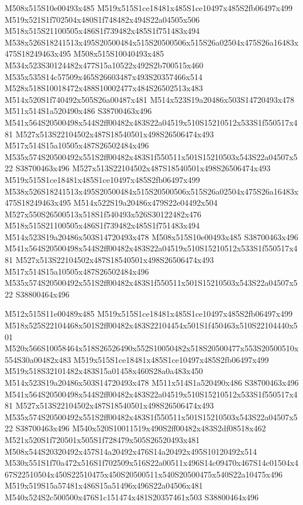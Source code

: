 \documentclass{article}
\begin{document}
\begin{multicols}{2}
M508x515S10e00493x485 M519x515S1ce18481x485S1ce10497x485S2fb06497x499 M519x521S1f702504x480S1f748482x494S22a04505x506 M518x515S21100505x486S1f739482x485S1f751483x494 M538x526S18241513x495S20500484x515S20500506x515S26a02504x475S26a16483x475S18249463x495 M508x515S10040493x485 M534x523S30124482x477S15a10522x492S2b700515x460 M535x535S14c57509x465S26603487x493S20357466x514 M528x518S10018472x488S10002477x484S26502513x483 M514x520S1f740492x505S26a00487x481 M514x523S19a20486x503S14720493x478 M511x514S1a520490x486 S38700463x496 M541x564S20500498x544S2ff00482x483S22a04519x510S15210512x533S1f550517x481 M527x513S22104502x487S18540501x498S26506474x493 M517x514S15a10505x487S26502484x496 M535x574S20500492x551S2ff00482x483S1f550511x501S15210503x543S22a04507x522 S38700463x496 M527x513S22104502x487S18540501x498S26506474x493 M519x515S1ce18481x485S1ce10497x485S2fb06497x499 M538x526S18241513x495S20500484x515S20500506x515S26a02504x475S26a16483x475S18249463x495 M514x522S19a20486x479S22e04492x504 M527x550S26500513x518S1f540493x526S30122482x476 M518x515S21100505x486S1f739482x485S1f751483x494 M514x523S19a20486x503S14720493x478 M508x515S10e00493x485 S38700463x496 M541x564S20500498x544S2ff00482x483S22a04519x510S15210512x533S1f550517x481 M527x513S22104502x487S18540501x498S26506474x493 M517x514S15a10505x487S26502484x496 M535x574S20500492x551S2ff00482x483S1f550511x501S15210503x543S22a04507x522 S38800464x496

M512x515S11e00489x485 M519x515S1ce18481x485S1ce10497x485S2fb06497x499 M518x525S22104468x501S2ff00482x483S22104454x501S1f450463x510S22104440x501 M520x566S10058464x518S26526490x552S10050482x518S20500477x553S20500510x554S30a00482x483 M519x515S1ce18481x485S1ce10497x485S2fb06497x499 M519x518S32101482x483S15a01458x460S28a0a483x450 M514x523S19a20486x503S14720493x478 M511x514S1a520490x486 S38700463x496 M541x564S20500498x544S2ff00482x483S22a04519x510S15210512x533S1f550517x481 M527x513S22104502x487S18540501x498S26506474x493 M535x574S20500492x551S2ff00482x483S1f550511x501S15210503x543S22a04507x522 S38700463x496 M540x520S10011519x490S2ff00482x483S2df08518x462 M521x520S1f720501x505S1f728479x505S26520493x481 M508x544S20320492x457S14a20492x476S14a20492x495S10120492x514 M530x551S1f70a472x516S1f702509x516S22a00511x496S14c09470x467S14c01504x467S22510504x450S22510475x450S20500511x540S20500475x540S22a10475x496 M519x519S15a57481x486S15a51496x496S22a04506x481 M540x524S2c500500x476S1c151474x481S20357461x503 S38800464x496


\end{multicols}
\end{document}
